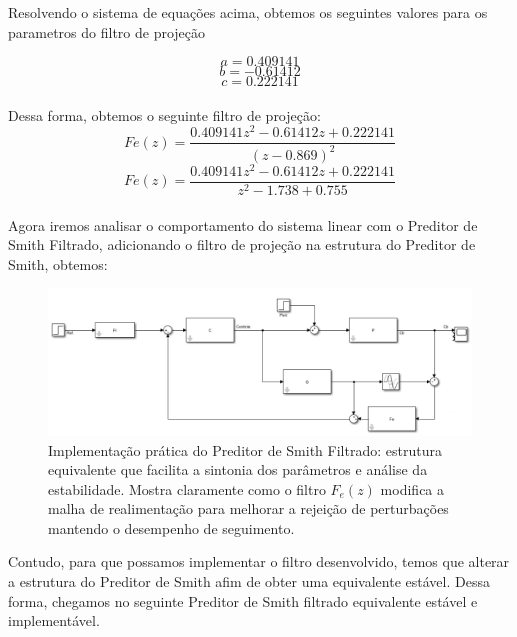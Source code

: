 \documentclass[a4paper,12pt]{article}
\begin{document}
Resolvendo o sistema de equações acima, obtemos os seguintes valores para os parametros do filtro de projeção

\begin{equation}
a =  0.409141
\end{equation}
\begin{equation}
b = -0.61412
\end{equation}
\begin{equation}
c = 0.222141
\end{equation}\\

Dessa forma, obtemos o seguinte filtro de projeção:\\

\begin{equation}
Fe(z) = \frac{0.409141z^2 - 0.61412z + 0.222141}{(z-0.869)^2}
\end{equation}
\begin{equation}
Fe(z) = \frac{0.409141z^2 - 0.61412z + 0.222141}{z^2 - 1.738 + 0.755}
\end{equation}\\

Agora iremos analisar o comportamento do sistema linear com o Preditor de Smith Filtrado, adicionando o filtro de projeção na estrutura do Preditor de Smith, obtemos:

\begin{figure}[h]
    \centering
    \includegraphics[width=0.9\linewidth]{image2.png}
    \caption{Implementação prática do Preditor de Smith Filtrado: estrutura equivalente que facilita a sintonia dos parâmetros e análise da estabilidade. Mostra claramente como o filtro $F_e(z)$ modifica a malha de realimentação para melhorar a rejeição de perturbações mantendo o desempenho de seguimento.}
    \label{fig:psf_implementation_practical}
\end{figure}

Contudo, para que possamos implementar o filtro desenvolvido, temos que alterar a estrutura do Preditor de Smith afim de obter uma equivalente estável. Dessa forma, chegamos no seguinte Preditor de Smith filtrado equivalente estável e implementável.
\end{document}
